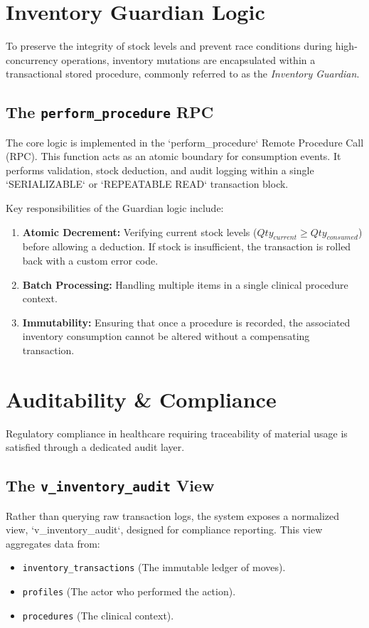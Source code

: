 \documentclass[12pt, openright, twoside, a4paper, english, french, spanish]{abntex2}
\begin{document}
\section{Inventory Guardian Logic}

To preserve the integrity of stock levels and prevent race conditions during high-concurrency operations, inventory mutations are encapsulated within a transactional stored procedure, commonly referred to as the \textit{Inventory Guardian}.

\subsection{The \texttt{perform\_procedure} RPC}
The core logic is implemented in the `perform_procedure` Remote Procedure Call (RPC). This function acts as an atomic boundary for consumption events. It performs validation, stock deduction, and audit logging within a single `SERIALIZABLE` or `REPEATABLE READ` transaction block.

Key responsibilities of the Guardian logic include:
\begin{enumerate}
    \item \textbf{Atomic Decrement:} Verifying current stock levels ($Qty_{current} \ge Qty_{consumed}$) before allowing a deduction. If stock is insufficient, the transaction is rolled back with a custom error code.
    \item \textbf{Batch Processing:} Handling multiple items in a single clinical procedure context.
    \item \textbf{Immutability:} Ensuring that once a procedure is recorded, the associated inventory consumption cannot be altered without a compensating transaction.
\end{enumerate}

\section{Auditability \& Compliance}

Regulatory compliance in healthcare requiring traceability of material usage is satisfied through a dedicated audit layer.

\subsection{The \texttt{v\_inventory\_audit} View}
Rather than querying raw transaction logs, the system exposes a normalized view, `v_inventory\_audit`, designed for compliance reporting. This view aggregates data from:
\begin{itemize}
    \item \texttt{inventory\_transactions} (The immutable ledger of moves).
    \item \texttt{profiles} (The actor who performed the action).
    \item \texttt{procedures} (The clinical context).
\end{itemize}
\end{document}
